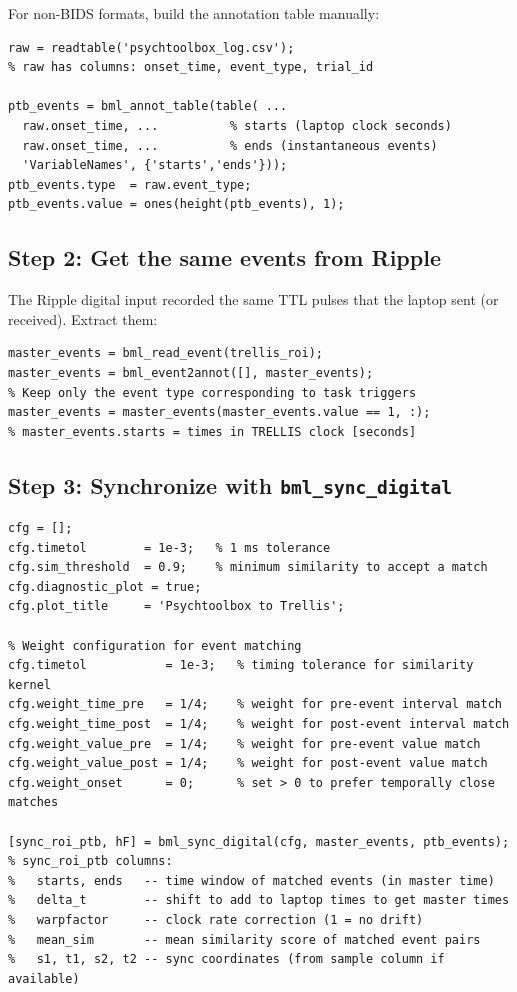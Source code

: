 \documentclass[11pt, a4paper]{article}
\begin{document}
For non-BIDS formats, build the annotation table manually:
\begin{lstlisting}[style=matlab]
raw = readtable('psychtoolbox_log.csv');
% raw has columns: onset_time, event_type, trial_id

ptb_events = bml_annot_table(table( ...
  raw.onset_time, ...          % starts (laptop clock seconds)
  raw.onset_time, ...          % ends (instantaneous events)
  'VariableNames', {'starts','ends'}));
ptb_events.type  = raw.event_type;
ptb_events.value = ones(height(ptb_events), 1);
\end{lstlisting}

\subsection{Step 2: Get the same events from Ripple}

The Ripple digital input recorded the same TTL pulses that the laptop sent (or received). Extract them:

\begin{lstlisting}[style=matlab]
master_events = bml_read_event(trellis_roi);
master_events = bml_event2annot([], master_events);
% Keep only the event type corresponding to task triggers
master_events = master_events(master_events.value == 1, :);
% master_events.starts = times in TRELLIS clock [seconds]
\end{lstlisting}

\subsection{Step 3: Synchronize with \texttt{bml\_sync\_digital}}

\begin{lstlisting}[style=matlab, caption={Synchronizing Psychtoolbox events to Trellis}]
cfg = [];
cfg.timetol        = 1e-3;   % 1 ms tolerance
cfg.sim_threshold  = 0.9;    % minimum similarity to accept a match
cfg.diagnostic_plot = true;
cfg.plot_title     = 'Psychtoolbox to Trellis';

% Weight configuration for event matching
cfg.timetol           = 1e-3;   % timing tolerance for similarity kernel
cfg.weight_time_pre   = 1/4;    % weight for pre-event interval match
cfg.weight_time_post  = 1/4;    % weight for post-event interval match
cfg.weight_value_pre  = 1/4;    % weight for pre-event value match
cfg.weight_value_post = 1/4;    % weight for post-event value match
cfg.weight_onset      = 0;      % set > 0 to prefer temporally close matches

[sync_roi_ptb, hF] = bml_sync_digital(cfg, master_events, ptb_events);
% sync_roi_ptb columns:
%   starts, ends   -- time window of matched events (in master time)
%   delta_t        -- shift to add to laptop times to get master times
%   warpfactor     -- clock rate correction (1 = no drift)
%   mean_sim       -- mean similarity score of matched event pairs
%   s1, t1, s2, t2 -- sync coordinates (from sample column if available)
\end{lstlisting}
\end{document}

